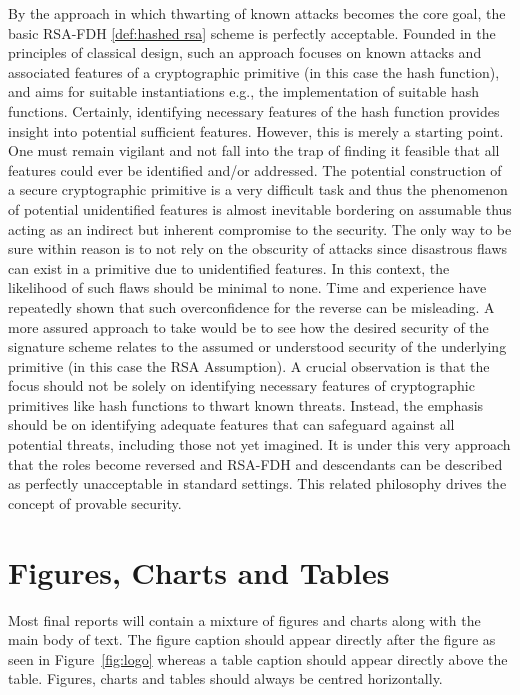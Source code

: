 \documentclass[]{final_report}
\theoremstyle{definition}
\begin{document}
By the approach in which thwarting of known attacks becomes the core goal, the basic RSA-FDH \ref{def:hashed rsa} scheme is perfectly acceptable. Founded in the principles of classical design, such an approach focuses on known attacks and associated features of a cryptographic primitive (in this case the hash function), and aims for suitable instantiations  e.g., the implementation of suitable hash functions. Certainly, identifying necessary features of the hash function provides insight into potential sufficient features. However, this is merely a starting point. One must remain vigilant and not fall into the trap of finding it feasible that all features could ever be identified and/or addressed. 
The potential construction of a secure cryptographic primitive is a very difficult task and thus the phenomenon of potential unidentified features is almost inevitable bordering on assumable thus acting as an indirect but inherent compromise to the security. The only way to be sure within reason is to not rely on the obscurity of attacks since disastrous flaws can exist in a primitive due to unidentified features. In this context, the likelihood of such flaws should be minimal to none. Time and experience have repeatedly shown that such overconfidence for the reverse can be misleading.
A more assured approach to take would be to see how the desired security of the signature scheme relates to the assumed or understood security of the underlying primitive (in this case the RSA Assumption). A crucial observation is that the focus should not be solely on identifying necessary features of cryptographic primitives like hash functions to thwart known threats. Instead, the emphasis should be on identifying adequate features that can safeguard against all potential threats, including those not yet imagined. It is under this very approach that the roles become reversed and RSA-FDH and descendants can be described as perfectly unacceptable in standard settings. This related philosophy drives the concept of provable security.



\section{Figures, Charts and Tables}

Most final reports will contain a mixture of figures and charts along with the main body of text. The figure caption should appear directly after the figure as seen in Figure~\ref{fig:logo} whereas a table caption should appear directly above the table. Figures, charts and tables should always be centred horizontally. 
\end{document}

